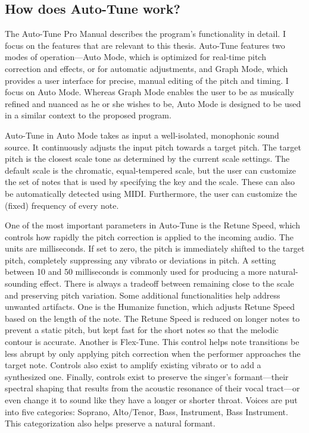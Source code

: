 \subsection{How does Auto-Tune work?}
The Auto-Tune Pro Manual \cite{antares:2018} describes the program's functionality in detail. I focus on the features that are relevant to this thesis. Auto-Tune features two modes of operation---Auto Mode, which is optimized for real-time pitch correction and effects, or for automatic adjustments, and Graph Mode, which provides a user interface for precise, manual editing of the pitch and timing. I focus on Auto Mode. Whereas Graph Mode enables the user to be as musically refined and nuanced as he or she wishes to be, Auto Mode is designed to be used in a similar context to the proposed program.   

Auto-Tune in Auto Mode takes as input a well-isolated, monophonic sound source. It continuously adjusts the input pitch towards a target pitch. The target pitch is the closest scale tone as determined by the current scale settings. The default scale is the chromatic, equal-tempered scale, but the user can customize the set of notes that is used by specifying the key and the scale. These can also be automatically detected using MIDI. Furthermore, the user can customize the (fixed) frequency of every note.

One of the most important parameters in Auto-Tune is the Retune Speed, which controls how rapidly the pitch correction is applied to the incoming audio. The units are milliseconds. If set to zero, the pitch is immediately shifted to the target pitch, completely suppressing any vibrato or deviations in pitch. A setting between 10 and 50 milliseconds is commonly used for producing a more natural-sounding effect. There is always a tradeoff between remaining close to the scale and preserving pitch variation. Some additional functionalities help address unwanted artifacts. One is the Humanize function, which adjusts Retune Speed based on the length of the note. The Retune Speed is reduced on longer notes to prevent a static pitch, but kept fast for the short notes so that the melodic contour is accurate. Another is Flex-Tune. This control helps note transitions be less abrupt by only applying pitch correction when the performer approaches the target note. Controls also exist to amplify existing vibrato or to add a synthesized one. Finally, controls exist to preserve the singer's formant---their spectral shaping that results from the acoustic resonance of their vocal tract---or even change it to sound like they have a longer or shorter throat. Voices are put into five categories: Soprano, Alto/Tenor, Bass, Instrument, Bass Instrument. This categorization also helps preserve a natural formant. 

